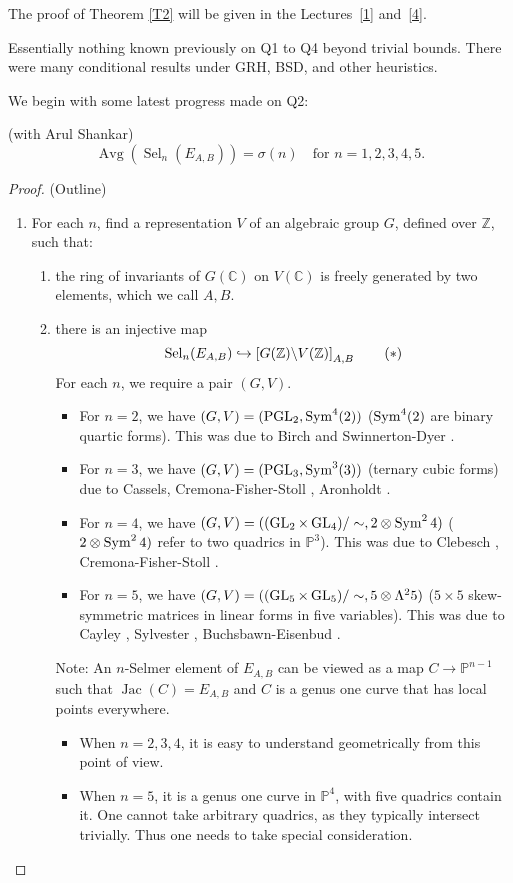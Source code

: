 \documentclass[12pt,amsfont]{amsart}
\begin{document}
The proof of Theorem \ref{T2} will be given in the Lectures~\ref{1} and~\ref{4}. 
\begin{rmk}
Essentially nothing known previously on Q1 to Q4 beyond trivial bounds. There were many conditional results under GRH, BSD, and other heuristics.
\end{rmk}
We begin with some latest progress made on Q2:
\begin{thm} \label{T1.4} (with Arul Shankar) 
\[
\operatorname{Avg}(\operatorname{Sel}_n(E_{A,B})) = \sigma(n)\quad \text{for } n = 1, 2, 3, 4, 5. 
\]
\end{thm}
\begin{proof} (Outline) 
\begin{enumerate}[\normalfont (a)]
\item\label{1.3a}
For each $n$, find a representation $V$ of an algebraic group $G$, defined over $\mathbb{Z}$, such that:
\begin{enumerate}[\normalfont (i)]
\item
the ring of invariants of $G(\mathbb{C})$ on $V(\mathbb{C})$ is freely generated by two elements, which we call $A,B$. \
\item
there is an injective map  
\begin{equation}\label{1.1}
\operatorname{Sel}_n(E_{A,B})\hookrightarrow
\left[G(\mathbb{Z}) \backslash V(\mathbb{Z}) \right]_{A,B} \tag{$\ast$}
\end{equation}
For each $n$, we require a pair $(G,V)$. 
\begin{itemize}
\item
For $n = 2$, we have $(G,V) = (\operatorname{PGL}_2, \operatorname{Sym}^4(2))$ ($\operatorname{Sym}^4(2)$ are binary quartic forms). This was due to Birch and Swinnerton-Dyer . 
\item
For $n = 3$, we have $(G,V) = (\operatorname{PGL}_3, \operatorname{Sym}^3(3))$ (ternary cubic forms) due to Cassels, Cremona-Fisher-Stoll , Aronholdt . 
\item
For $n = 4$, we have $(G,V) = ((\operatorname{GL}_2 \times \operatorname{GL}_4)/\sim, 2 \otimes \operatorname{Sym}^2 4)$ ($2 \otimes \operatorname{Sym}^2 4)$ refer to two quadrics in $\mathbb{P}^3$). This was due to Clebesch , Cremona-Fisher-Stoll . 
\item
For $n=5$, we have $(G,V) = ((\operatorname{GL}_5 \times \operatorname{GL}_5)/\sim, 5 \otimes \Lambda^2 5)$ ($5 \times 5$ skew-symmetric matrices in linear forms in five variables). This was due to Cayley , Sylvester , Buchsbawn-Eisenbud .
\end{itemize}

Note: An $n$-Selmer element of $E_{A,B}$ can be viewed as a map $C \rightarrow \mathbb{P}^{n-1}$ such that $\operatorname{Jac}(C) = E_{A,B}$ and $C$ is a genus one curve that has local points everywhere.
\begin{itemize}
\item
When $n=2,3,4$, it is easy to understand geometrically from this point of view.
\item
When $n = 5$, it is a genus one curve in $\mathbb{P}^4$, with five quadrics contain it. One cannot take arbitrary quadrics, as they typically intersect trivially. Thus one needs to take special consideration. 
\end{itemize}
\end{enumerate}
\end{enumerate}


\end{proof}
\end{document}
